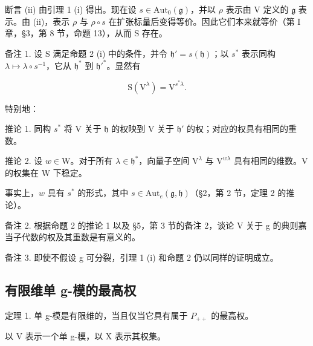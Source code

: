 断言 (ii) 由引理 1 (i) 得出。现在设 \(s \in \mathrm{Aut}_0(\mathfrak{g})\)，并以 \(\rho\) 表示由 V 定义的 \(\mathfrak{g}\) 表示。由 (ii)，表示 \(\rho\) 与 \(\rho \circ s\) 在扩张标量后变得等价。因此它们本来就等价（第 I 章，§3，第 8 节，命题 13），从而 S 存在。

备注 1. 设 S 满足命题 2 (i) 中的条件，并令 \(\mathfrak{h}' = s(\mathfrak{h})\)；以 \(s^*\) 表示同构 \(\lambda \mapsto \lambda \circ s^{-1}\)，它从 \(\mathfrak{h}^*\) 到 \(\mathfrak{h}'^*\)。显然有

\[
\mathrm{S} (\mathrm{V} ^ {\lambda}) = \mathrm{V} ^ {s ^ {*} \lambda}.
\]

特别地：

推论 1. 同构 \(s^*\) 将 V 关于 \(\mathfrak{h}\) 的权映到 V 关于 \(\mathfrak{h}'\) 的权；对应的权具有相同的重数。

推论 2. 设 \(w \in \mathrm{W}\)。对于所有 \(\lambda \in \mathfrak{h}^*\)，向量子空间 \(\mathrm{V}^{\lambda}\) 与 \(\mathrm{V}^{w\lambda}\) 具有相同的维数。\(\mathrm{V}\) 的权集在 \(\mathrm{W}\) 下稳定。

事实上，\(w\) 具有 \(s^*\) 的形式，其中 \(s \in \mathrm{Aut}_e(\mathfrak{g}, \mathfrak{h})\)（§2，第 2 节，定理 2 的推论）。

备注 2. 根据命题 2 的推论 1 以及 §5，第 3 节的备注 2，谈论 V 关于 g 的典则嘉当子代数的权及其重数是有意义的。

备注 3. 即使不假设 g 可分裂，引理 1 (i) 和命题 2 仍以同样的证明成立。

\subsection{有限维单 g-模的最高权}

定理 1. 单 g-模是有限维的，当且仅当它具有属于 \(P_{++}\) 的最高权。

以 V 表示一个单 g-模，以 X 表示其权集。

